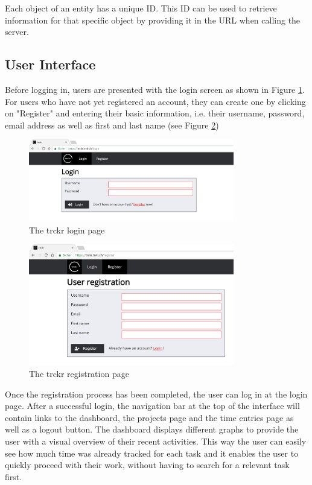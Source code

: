 \documentclass[bibliography=totoc, listof=totocnumbered]{scrartcl}
\begin{document}
Each object of an entity has a unique ID. This ID can be used to retrieve
information for that specific object by providing it in the URL when calling the
server.

\subsection{User Interface}
Before logging in, users are presented with the login screen as shown in Figure
\ref{fig:trckr-login}. For users who have not yet registered an account, they
can create one by clicking on "Register" and entering their basic information,
i.e. their username, password, email address as well as first and last name (see
Figure \ref{fig:trckr-register})

\begin{figure}[h]
    \includegraphics[width=0.8\textwidth]{trckr-login}
    \caption{The trckr login page}
    \label{fig:trckr-login}
\end{figure}

\begin{figure}[h]
    \includegraphics[width=0.8\textwidth]{trckr-register}
    \caption{The trckr registration page}
    \label{fig:trckr-register}
\end{figure}

Once the registration process has been completed, the user can log in at the
login page. After a successful login, the navigation bar at the top of the
interface will contain links to the dashboard, the projects page and the time
entries page as well as a logout button. The dashboard displays different graphs
to provide the user with a visual overview of their recent activities. This way
the user can easily see how much time was already tracked for each task and it
enables the user to quickly proceed with their work, without having to search
for a relevant task first.
\end{document}
